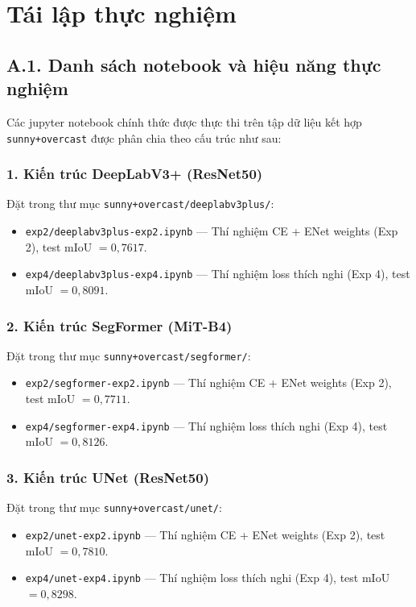 \chapter{Tái lập thực nghiệm}
\label{ap:reproduce}

\section*{A.1. Danh sách notebook và hiệu năng thực nghiệm}
Các jupyter notebook chính thức được thực thi trên tập dữ liệu kết hợp \texttt{sunny+overcast} được phân chia theo cấu trúc như sau:

\subsection*{1. Kiến trúc DeepLabV3+ (ResNet50)}
Đặt trong thư mục \texttt{sunny+overcast/deeplabv3plus/}:
\begin{itemize}[leftmargin=1.4cm]
  \item \texttt{exp2/deeplabv3plus-exp2.ipynb} --- Thí nghiệm CE + ENet weights (Exp 2), test mIoU $= 0{,}7617$.
  \item \texttt{exp4/deeplabv3plus-exp4.ipynb} --- Thí nghiệm loss thích nghi (Exp 4), test mIoU $= 0{,}8091$.
\end{itemize}

\subsection*{2. Kiến trúc SegFormer (MiT-B4)}
Đặt trong thư mục \texttt{sunny+overcast/segformer/}:
\begin{itemize}[leftmargin=1.4cm]
  \item \texttt{exp2/segformer-exp2.ipynb} --- Thí nghiệm CE + ENet weights (Exp 2), test mIoU $= 0{,}7711$.
  \item \texttt{exp4/segformer-exp4.ipynb} --- Thí nghiệm loss thích nghi (Exp 4), test mIoU $= 0{,}8126$.
\end{itemize}

\subsection*{3. Kiến trúc UNet (ResNet50)}
Đặt trong thư mục \texttt{sunny+overcast/unet/}:
\begin{itemize}[leftmargin=1.4cm]
  \item \texttt{exp2/unet-exp2.ipynb} --- Thí nghiệm CE + ENet weights (Exp 2), test mIoU $= 0{,}7810$.
  \item \texttt{exp4/unet-exp4.ipynb} --- Thí nghiệm loss thích nghi (Exp 4), test mIoU $= 0{,}8298$.
\end{itemize}

